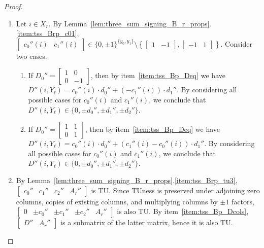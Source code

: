 \begin{proof}
\begin{enumerate}
        \item Let $i \in X_{r}$. By Lemma~\ref{lem:three_sum_signing_B_r_props}.\ref{item:tss_Brp_c01}, $\begin{bmatrix} c_{0}'' (i) & c_{1}'' (i) \end{bmatrix} \in \{0, \pm 1\}^{\{y_{0}, y_{1}\}} \setminus \left\{ \begin{bmatrix} 1 & -1 \end{bmatrix}, \begin{bmatrix} -1 & 1 \end{bmatrix} \right\}$. Consider two cases.
        \begin{enumerate}
            \item If $D_{0}'' = \begin{bmatrix} 1 & 0 \\ 0 & -1 \end{bmatrix}$, then by item~\ref{item:tss_Bp_Deq} we have $D'' (i, Y_{\ell}) = c_{0}'' (i) \cdot d_{0}''  + (-c_{1}'' (i)) \cdot d_{1}''$. By considering all possible cases for $c_{0}'' (i)$ and $c_{1}'' (i)$, we conclude that $D'' (i, Y_{\ell}) \in \{0, \pm d_{0}'', \pm d_{1}'', \pm d_{2}''\}$.
            \item If $D_{0}'' = \begin{bmatrix} 1 & 1 \\ 0 & 1 \end{bmatrix}$, then by item~\ref{item:tss_Bp_Deq} we have $D'' (i, Y_{\ell}) = c_{0}'' (i) \cdot d_{0}'' + (c_{1}'' (i) - c_{0}'' (i)) \cdot d_{1}''$. By considering all possible cases for $c_{0}'' (i)$ and $c_{1}'' (i)$, we conclude that $D'' (i, Y_{\ell}) \in \{0, \pm d_{0}'', \pm d_{1}'', \pm d_{2}''\}$.
        \end{enumerate}

        \item By Lemma~\ref{lem:three_sum_signing_B_r_props}.\ref{item:tss_Brp_tu3}, $\begin{bmatrix} c_{0}'' & c_{1}'' & c_{2}'' & A_{r}'' \end{bmatrix}$ is TU. Since TUness is preserved under adjoining zero columns, copies of existing columns, and multiplying columns by $\pm 1$ factors, $\begin{bmatrix} 0 & \pm c_{0}'' & \pm c_{1}'' & \pm c_{2}'' & A_{r}'' \end{bmatrix}$ is also TU. By item~\ref{item:tss_Bp_Dcols}, $\begin{bmatrix} D'' & A_{r}'' \end{bmatrix}$ is a submatrix of the latter matrix, hence it is also TU.


\end{enumerate}
\end{proof}
